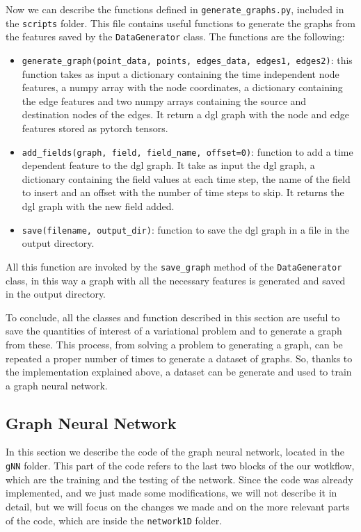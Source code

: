 \documentclass[11pt,a4paper]{article}
\begin{document}
Now we can describe the functions defined in \texttt{generate\_graphs.py}, included in the \texttt{scripts} folder. This file contains useful functions to generate the graphs from the features saved by the \texttt{DataGenerator} class.
The functions are the following: 
\begin{itemize}
    \item \texttt{generate\_graph(point\_data, points, edges\_data, edges1, edges2)}: this function takes as input a dictionary containing the time independent node features, a numpy array with the node coordinates, a dictionary containing the edge features and two numpy arrays containing the source and destination nodes of the edges. It return a dgl graph with the node and edge features stored as pytorch tensors.
    \item \texttt{add\_fields(graph, field, field\_name, offset=0)}: function to add a time dependent feature to the dgl graph. It take as input the dgl graph, a dictionary containing the field values at each time step, the name of the field to insert and an offset with the number of time steps to skip. It returns the dgl graph with the new field added.
    \item \texttt{save(filename, output\_dir)}: function to save the dgl graph in a file in the output directory.
\end{itemize}

All this function are invoked by the \texttt{save\_graph} method of the \texttt{DataGenerator} class, in this way a graph with all the necessary features is generated and saved in the output directory.

To conclude, all the classes and function described in this section are useful to save the quantities of interest of a variational problem and to generate a graph from these. This process, from solving a problem to generating a graph, can be repeated a proper number of times to generate a dataset of graphs. 
So, thanks to the implementation explained above, a dataset can be generate and used to train a graph neural network.

\subsection{Graph Neural Network}
\label{gnn}

In this section we describe the code of the graph neural network, located in the \texttt{gNN} folder. This part of the code refers to the last two blocks of the our wotkflow, which are the training and the testing of the network.
Since the code was already implemented, and we just made some modifications, we will not describe it in detail, but we will focus on the changes we made and on the more relevant parts of the code, which are inside the \texttt{network1D} folder.
\end{document}

